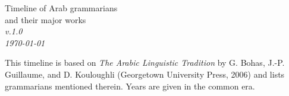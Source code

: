 \documentclass[a4paper,landscape]{article}
\begin{document}
\thispagestyle{empty}

\begin{minipage}[t]{.4\textwidth}
{\LARGE Timeline of Arab grammarians\\and their major works}\\[\medskipamount]
\textit{v.1.0\\\today}
\end{minipage}
\hfill
\begin{minipage}[t]{.4\textwidth}
This timeline is based on \textit{The Arabic Linguistic Tradition} by G. Bohas, \mbox{J.-P.} Guillaume, and D. Kouloughli (Georgetown University Press, 2006) and lists grammarians mentioned therein. Years are given in the common era.
\end{minipage}


\vfill
\end{document}
